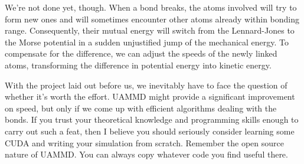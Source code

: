 We're not done yet, though. When a bond breaks, the atoms involved will try to 
form new ones and will sometimes encounter other atoms already within bonding 
range. Consequently, their mutual energy will switch from the Lennard-Jones to 
the Morse potential in a sudden unjustified jump of the mechanical energy. To 
compensate for the difference, we can adjust the speeds of the newly linked 
atoms, transforming the difference in potential energy into kinetic energy.

With the project laid out before us, we inevitably have to face the question of 
whether it's worth the effort. UAMMD might provide a significant improvement on 
speed, but only if we come up with efficient algorithms dealing with the bonds. 
If you trust your theoretical knowledge and programming skills enough to carry 
out such a feat, then I believe you should seriously consider learning some CUDA 
and writing your simulation from scratch. Remember the open source nature of 
UAMMD. You can always copy whatever code you find useful there.


